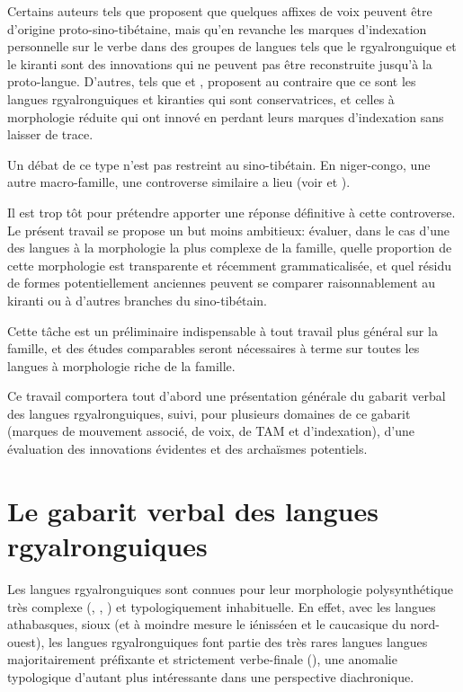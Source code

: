 \documentclass[oldfontcommands,oneside,a4paper,11pt]{article}
\begin{document}
Certains auteurs tels que  \citet{lapolla03} proposent que quelques affixes de voix peuvent être d'origine proto-sino-tibétaine, mais qu'en revanche les marques d'indexation personnelle sur le verbe dans des groupes de langues tels que le rgyalronguique et le kiranti sont des innovations qui ne peuvent pas être reconstruite jusqu'à la proto-langue. D'autres, tels que  \citet{driem93agreement}  et \citet{delancey10agreement}, proposent au contraire que ce sont les langues rgyalronguiques et kiranties qui sont conservatrices, et celles à morphologie réduite qui ont innové en perdant leurs marques d'indexation sans laisser de trace.

Un débat de ce type n'est pas restreint au sino-tibétain. En niger-congo, une autre macro-famille, une controverse similaire a lieu (voir  \citealt{guldeman08macrosudan} et  \citealt{hyman11macrosudan}). 

Il est trop tôt pour prétendre apporter une réponse définitive à cette controverse. Le présent travail se propose un but moins ambitieux: évaluer, dans le cas d'une des langues à la morphologie la plus complexe de la famille, quelle proportion de cette morphologie est transparente et récemment grammaticalisée, et quel résidu de formes potentiellement anciennes peuvent se comparer raisonnablement au kiranti ou à d'autres branches du sino-tibétain. 

Cette tâche est un préliminaire indispensable à tout travail plus général sur la famille, et des études comparables seront nécessaires à terme  sur toutes les langues à morphologie riche de la famille.


Ce travail comportera tout d'abord une présentation générale du gabarit verbal des langues rgyalronguiques, suivi, pour plusieurs domaines de ce gabarit (marques de mouvement associé, de voix, de TAM et d'indexation), d'une évaluation des innovations évidentes et des archaïsmes potentiels.

\section{Le gabarit verbal des langues rgyalronguiques}
Les langues rgyalronguiques sont connues pour leur morphologie polysynthétique très complexe (\citealt{jacques12incorp}, \citealt{lai13affixale}, \citealt{jackson14morpho}) et typologiquement inhabituelle. En effet, avec les langues athabasques, sioux (et à moindre mesure le iénisséen  et le caucasique du nord-ouest), les langues rgyalronguiques font partie des très rares langues langues majoritairement préfixante et strictement verbe-finale (\citealt{jacques13harmonization}), une anomalie typologique d'autant plus intéressante dans une perspective diachronique.
 
\end{document}
